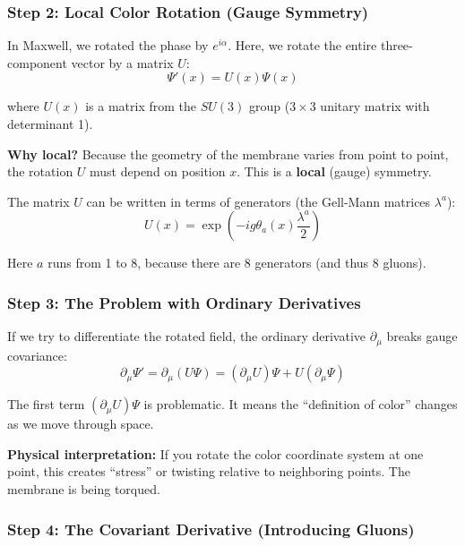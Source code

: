 \subsubsection{Step 2: Local Color Rotation (Gauge Symmetry)}

In Maxwell, we rotated the phase by $e^{i\alpha}$. Here, we rotate the entire three-component vector by a matrix $U$:
\begin{equation}
\Psi'(x) = U(x) \Psi(x)
\end{equation}

where $U(x)$ is a matrix from the $SU(3)$ group ($3 \times 3$ unitary matrix with determinant 1).

\textbf{Why local?} Because the geometry of the membrane varies from point to point, the rotation $U$ must depend on position $x$. This is a \textbf{local} (gauge) symmetry.

The matrix $U$ can be written in terms of generators (the Gell-Mann matrices $\lambda^a$):
\begin{equation}
U(x) = \exp\left(-ig\theta_a(x)\frac{\lambda^a}{2}\right)
\end{equation}

Here $a$ runs from 1 to 8, because there are 8 generators (and thus 8 gluons).

\subsubsection{Step 3: The Problem with Ordinary Derivatives}

If we try to differentiate the rotated field, the ordinary derivative $\partial_\mu$ breaks gauge covariance:
\begin{equation}
\partial_\mu \Psi' = \partial_\mu(U\Psi) = (\partial_\mu U)\Psi + U(\partial_\mu \Psi)
\end{equation}

The first term $(\partial_\mu U)\Psi$ is problematic. It means the ``definition of color'' changes as we move through space.

\textbf{Physical interpretation:} If you rotate the color coordinate system at one point, this creates ``stress'' or twisting relative to neighboring points. The membrane is being torqued.

\subsubsection{Step 4: The Covariant Derivative (Introducing Gluons)}

